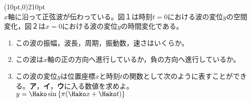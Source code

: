 \hakosyokika
\item
    \begin{mawarikomi}(10pt,0){210pt}{ \\ }
        $x$軸に沿って正弦波が伝わっている。図１は時刻$t=0$における波の変位$y$の空間変化，図２は$x=0$における波の変位$y$の時間変化である。
        \begin{enumerate}
            \item この波の振幅，波長，周期，振動数，速さはいくらか。
            \item この波は$x$軸の正の方向へ進行しているか，負の方向へ進行しているか。
            \item この波の変位$y$は位置座標$x$と時刻$t$の関数として次のように表すことができる。{\bf ア}，{\bf イ}，{\bf ウ}に入る数値を求めよ。\\
            $ y=\Hako \sin{ \{ \pi (\Hako x+\Hako t) \} }$
        \end{enumerate}
    \end{mawarikomi}
